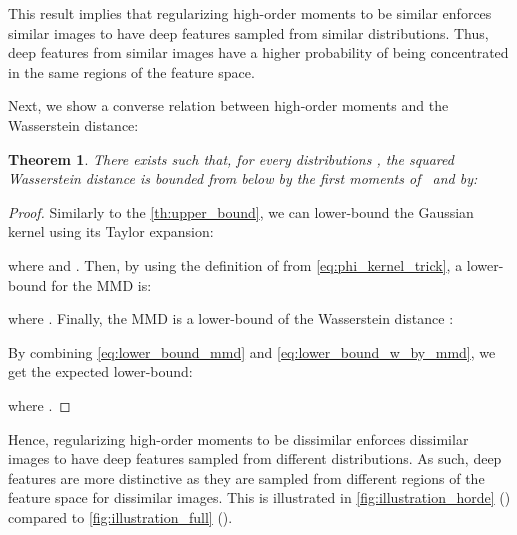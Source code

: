 \documentclass[10pt,twocolumn,letterpaper]{article}
\newtheorem{theorem}{Theorem}
\begin{document}
        This result implies that regularizing high-order moments to be similar enforces similar images to have deep features sampled from similar distributions.
        Thus, deep features from similar images have a higher probability of being concentrated in the same regions of the feature space.
        
        Next, we show a converse relation between high-order moments and the Wasserstein distance:
        \begin{theorem}
            There exists  such that, for every distributions , the squared Wasserstein distance is bounded from below by the  first moments of \  and  by:
            
        \end{theorem}
        
        \begin{proof}
            Similarly to the \autoref{th:upper_bound}, we can lower-bound the Gaussian kernel using its Taylor expansion:
            
            where  and .
            Then, by using the definition of  from \autoref{eq:phi_kernel_trick}, a lower-bound for the MMD is:

            where .
            Finally, the MMD is a lower-bound of the Wasserstein distance \cite{Sriperumbudur_2010_JMLR}:
            
            By combining \autoref{eq:lower_bound_mmd} and \autoref{eq:lower_bound_w_by_mmd}, we get the expected lower-bound:
            
            where .
        \end{proof}
        Hence, regularizing high-order moments to be dissimilar enforces dissimilar images to have deep features sampled from different distributions.
        As such, deep features are more distinctive as they are sampled from different regions of the feature space for dissimilar images.
        This is illustrated in \autoref{fig:illustration_horde} () compared to \autoref{fig:illustration_full} ().
        
        
\end{document}

